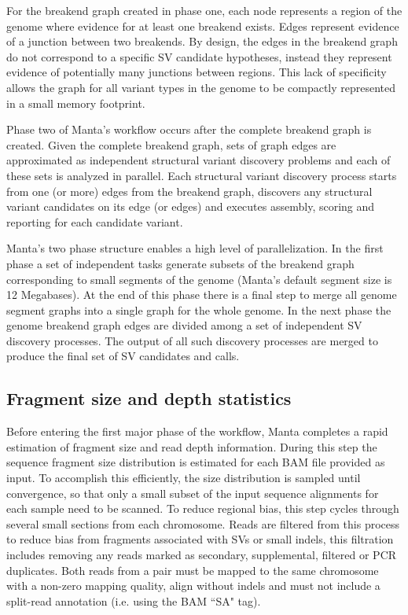 \documentclass{article}
\begin{document}
For the breakend graph created in phase one, each node represents a region of the genome where evidence for at least one breakend exists. Edges represent evidence of a junction between two breakends. By design, the edges in the breakend graph do not correspond to a specific SV candidate hypotheses, instead they represent evidence of potentially many junctions between regions. This lack of specificity allows the graph for all variant types in the genome to be compactly represented in a small memory footprint. 

Phase two of Manta's workflow occurs after the complete breakend graph is created. Given the complete breakend graph, sets of graph edges are approximated as independent structural variant discovery problems and each of these sets is analyzed in parallel. Each structural variant discovery process starts from one (or more) edges from the breakend graph, discovers any structural variant candidates on its edge (or edges) and executes assembly, scoring and reporting for each candidate variant.

Manta's two phase structure enables a high level of parallelization. In the first phase a set of independent tasks generate subsets of the breakend graph corresponding to small segments of the genome (Manta's default segment size is 12 Megabases). At the end of this phase there is a final step to merge all genome segment graphs into a single graph for the whole genome. In the next phase the genome breakend graph edges are divided among a set of independent SV discovery processes. The output of all such discovery processes are merged to produce the final set of SV candidates and calls.

\subsection{Fragment size and depth statistics}

Before entering the first major phase of the workflow, Manta completes a rapid estimation of fragment size and read depth information. During this step the sequence fragment size distribution is estimated for each BAM file provided as input. To accomplish this efficiently, the size distribution is sampled until convergence, so that only a small subset of the input sequence alignments for each sample need to be scanned. To reduce regional bias, this step cycles through several small sections from each chromosome. Reads are filtered from this process to reduce bias from fragments associated with SVs or small indels, this filtration includes removing any reads marked as secondary, supplemental, filtered or PCR duplicates. Both reads from a pair must be mapped to the same chromosome with a non-zero mapping quality, align without indels and must not include a split-read annotation (i.e. using the BAM ``SA" tag).
\end{document}
